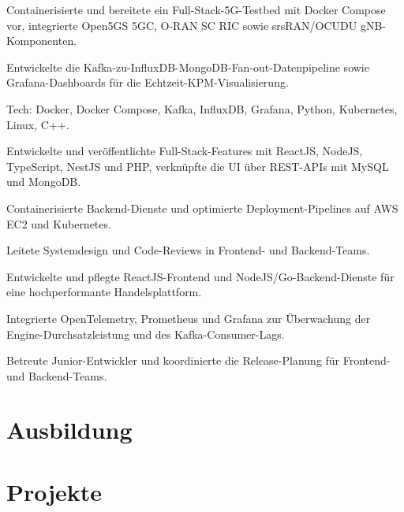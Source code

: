 \documentclass[10pt,a4paper]{resume}
\begin{document}
\bullets
  \item Containerisierte und bereitete ein Full-Stack-5G-Testbed mit Docker Compose vor, integrierte Open5GS 5GC, O-RAN SC RIC sowie srsRAN/OCUDU gNB-Komponenten.
  \item Entwickelte die Kafka-zu-InfluxDB-MongoDB-Fan-out-Datenpipeline sowie Grafana-Dashboards für die Echtzeit-KPM-Visualisierung.
  \item Tech: Docker, Docker Compose, Kafka, InfluxDB, Grafana, Python, Kubernetes, Linux, C++.
\bulletsend
\vspace{1.5pt}
\bullets
  \item Entwickelte und veröffentlichte Full-Stack-Features mit ReactJS, NodeJS, TypeScript, NestJS und PHP, verknüpfte die UI über REST-APIs mit MySQL und MongoDB.
  \item Containerisierte Backend-Dienste und optimierte Deployment-Pipelines auf AWS EC2 und Kubernetes.
  \item Leitete Systemdesign und Code-Reviews in Frontend- und Backend-Teams.
\bulletsend
\vspace{1.5pt}
\bullets
  \item Entwickelte und pflegte ReactJS-Frontend und NodeJS/Go-Backend-Dienste für eine hochperformante Handelsplattform.
  \item Integrierte OpenTelemetry, Prometheus und Grafana zur Überwachung der Engine-Durchsatzleistung und des Kafka-Consumer-Lags.
  \item Betreute Junior-Entwickler und koordinierte die Release-Planung für Frontend- und Backend-Teams.
\bulletsend
\vspace{1.5pt}

\section{Ausbildung}

\vspace{2pt}

\section{Projekte}
\end{document}
